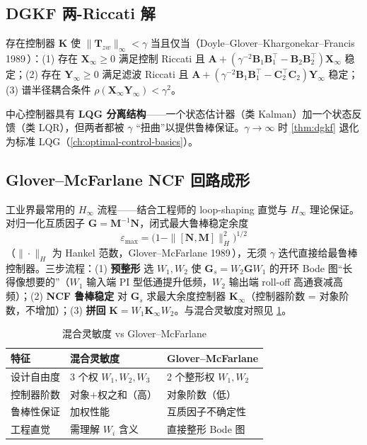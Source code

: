 \subsection{DGKF 两-Riccati 解}
\begin{theorem}
\label{thm:dgkf}
存在控制器 $\mathbf K$ 使 $\|\mathbf T_{zw}\|_\infty<\gamma$ 当且仅当（Doyle--Glover--Khargonekar--Francis 1989\,\cite{doyle1989dgkf}）：(1) 存在 $\mathbf X_\infty\ge0$ 满足控制 Riccati 且 $\mathbf A+(\gamma^{-2}\mathbf B_1\mathbf B_1^\top-\mathbf B_2\mathbf B_2^\top)\mathbf X_\infty$ 稳定；(2) 存在 $\mathbf Y_\infty\ge0$ 满足滤波 Riccati 且 $\mathbf A+(\gamma^{-2}\mathbf B_1\mathbf B_1^\top-\mathbf C_2^\top\mathbf C_2)\mathbf Y_\infty$ 稳定；(3) 谱半径耦合条件 $\rho(\mathbf X_\infty\mathbf Y_\infty)<\gamma^2$。
\end{theorem}
中心控制器具有 \textbf{LQG 分离结构}——一个状态估计器（类 Kalman）加一个状态反馈（类 LQR），但两者都被 $\gamma$ “扭曲”以提供鲁棒保证。$\gamma\to\infty$ 时 \cref{thm:dgkf} 退化为标准 LQG（\cref{ch:optimal-control-basics}）。

\subsection{Glover--McFarlane NCF 回路成形}
工业界最常用的 $H_\infty$ 流程——结合工程师的 loop-shaping 直觉与 $H_\infty$ 理论保证。对归一化互质因子 $\mathbf G=\mathbf M^{-1}\mathbf N$，闭式最大鲁棒稳定余度
\begin{equation}
  \varepsilon_{\max}=\big(1-\|[\mathbf N,\mathbf M]\|_H^2\big)^{1/2}
  \label{eq:ncf-eps}
\end{equation}
（$\|\cdot\|_H$ 为 Hankel 范数，Glover--McFarlane 1989\,\cite{glover1989ncf}），无须 $\gamma$ 迭代直接给最鲁棒控制器。三步流程：(1) \textbf{预整形} 选 $W_1,W_2$ 使 $\mathbf G_s=W_2\mathbf G W_1$ 的开环 Bode 图“长得像想要的”（$W_1$ 输入端 PI 型低通提升低频，$W_2$ 输出端 roll-off 高通衰减高频）；(2) \textbf{NCF 鲁棒稳定} 对 $\mathbf G_s$ 求最大余度控制器 $\mathbf K_\infty$（控制器阶数 = 对象阶数，不增加）；(3) \textbf{拼回} $\mathbf K=W_1\mathbf K_\infty W_2$。与混合灵敏度对照见 \cref{tab:ncf-vs-mixed}。

\begin{table}[H]\centering\small
\caption{混合灵敏度 vs Glover--McFarlane}
\label{tab:ncf-vs-mixed}
\begin{tabular}{lll}
\toprule
特征 & 混合灵敏度 & Glover--McFarlane \\
\midrule
设计自由度 & 3 个权 $W_1,W_2,W_3$ & 2 个整形权 $W_1,W_2$ \\
控制器阶数 & 对象+权之和（高） & 对象阶数（低） \\
鲁棒性保证 & 加权性能 & 互质因子不确定性 \\
工程直觉 & 需理解 $W_i$ 含义 & 直接整形 Bode 图 \\
\bottomrule
\end{tabular}
\end{table}

